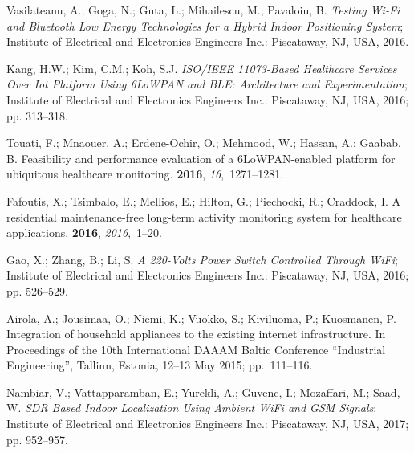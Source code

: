\documentclass[symmetry,article,accept,moreauthors,pdftex10pt,a4paper]{mdpi}
\begin{document}
\begin{thebibliography}{999}
Vasilateanu, A.; Goga, N.; Guta, L.; Mihailescu, M.; Pavaloiu, B.
\newblock \emph{Testing Wi-Fi and Bluetooth Low Energy Technologies for a Hybrid
	Indoor Positioning System};
\newblock Institute of Electrical and Electronics Engineers Inc.: Piscataway, NJ, USA, 2016.

Kang, H.W.; Kim, C.M.; Koh, S.J.
\newblock \emph{ISO/IEEE 11073-Based Healthcare Services Over Iot Platform Using
	6LoWPAN and BLE: Architecture and Experimentation};
\newblock Institute of Electrical and Electronics Engineers Inc.: Piscataway, NJ, USA, 2016; pp.
313--318.

Touati, F.; Mnaouer, A.; Erdene-Ochir, O.; Mehmood, W.; Hassan, A.; Gaabab, B.
\newblock Feasibility and performance evaluation of a 6LoWPAN-enabled platform
for ubiquitous healthcare monitoring.
 {\bf 2016}, {\em
	16},~1271--1281.

Fafoutis, X.; Tsimbalo, E.; Mellios, E.; Hilton, G.; Piechocki, R.; Craddock,
I.
\newblock A residential maintenance-free long-term activity monitoring system
for healthcare applications.
 {\bf
	2016}, {\em 2016},~1--20.

Gao, X.; Zhang, B.; Li, S.
\newblock \emph{A 220-Volts Power Switch Controlled Through WiFi};
\newblock Institute of Electrical and Electronics Engineers Inc.: Piscataway, NJ, USA, 2016; pp.
526--529.

Airola, A.; Jousimaa, O.; Niemi, K.; Vuokko, S.; Kiviluoma, P.; Kuosmanen, P.
\newblock Integration of household appliances to the existing internet
infrastructure. In Proceedings of the 10th International DAAAM Baltic Conference ``Industrial Engineering'', Tallinn, Estonia, 12--13 May 2015;
\newblock pp.~111--116.

Nambiar, V.; Vattapparamban, E.; Yurekli, A.; Guvenc, I.; Mozaffari, M.; Saad,
W.
\newblock \emph{SDR Based Indoor Localization Using Ambient WiFi and GSM Signals};
\newblock Institute of Electrical and Electronics Engineers Inc.: Piscataway, NJ, USA, 2017; pp.
952--957.


\end{thebibliography}
\end{document}
